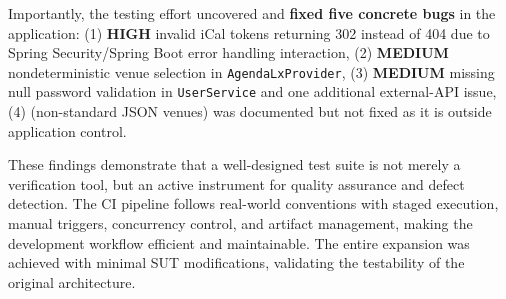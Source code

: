 \documentclass[11pt]{article}
\begin{document}
  Importantly, the testing effort uncovered and \textbf{fixed five concrete bugs} in the application: (1) \textbf{HIGH} invalid iCal tokens returning 302 instead of 404 due to Spring Security/Spring Boot error handling interaction, (2) \textbf{MEDIUM} nondeterministic venue selection in \texttt{AgendaLxProvider}, (3) \textbf{MEDIUM} missing null password validation in \texttt{UserService} and one additional external-API issue, (4) (non-standard JSON venues) was documented but not fixed as it is outside application control.

  These findings demonstrate that a well-designed test suite is not merely a verification tool, but an active instrument for quality assurance and defect detection. The CI pipeline follows real-world conventions with staged execution, manual triggers, concurrency control, and artifact management, making the development workflow efficient and maintainable. The entire expansion was achieved with minimal SUT modifications, validating the testability of the original architecture.
\end{document}
